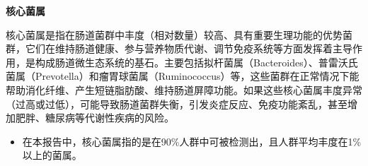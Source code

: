 \documentclass[UTF8]{ctexart}
\begin{document}
\newpage

\begin{tcolorbox}[
    enhanced,
    colback=white,
    colframe=white,
    arc=2mm,
    boxrule=0pt,
    width=\textwidth,
    left=15pt,
    right=15pt,
    top=10pt,
    bottom=10pt,
    drop shadow={
        opacity=0.2,
        color=customTeal
    },
    borderline west={5pt}{0pt}{customTeal}
]
\textcolor{customTeal}{\large\faBacteria\textbf{核心菌属}}
\end{tcolorbox}

\vspace{0.05cm}

\begin{tcolorbox}[
    enhanced,
    colback=customTeal!15,
    colframe=customTeal,
    arc=3mm,
    boxrule=0pt,
    width=\textwidth,
    top=8pt,
    bottom=8pt
]
{\normalsize{\color{customTeal}\faInfoCircle} 核心菌属是指在肠道菌群中丰度（相对数量）较高、具有重要生理功能的优势菌群，它们在维持肠道健康、参与营养物质代谢、调节免疫系统等方面发挥着主导作用，是构成肠道微生态系统的基石。主要包括拟杆菌属（Bacteroides）、普雷沃氏菌属（Prevotella）和瘤胃球菌属（Ruminococcus）等，这些菌群在正常情况下能帮助消化纤维、产生短链脂肪酸、维持肠道屏障功能。如果这些核心菌属丰度异常（过高或过低），可能导致肠道菌群失衡，引发炎症反应、免疫功能紊乱，甚至增加肥胖、糖尿病等代谢性疾病的风险。
\begin{itemize}
    \item 在本报告中，核心菌属指的是在90\%人群中可被检测出，且人群平均丰度在1\%以上的菌属。
\end{itemize}
}
\end{tcolorbox}

\vspace{-0.5cm}

\newcommand{\fooddata}{
    {
        {梭菌属}/{Clostridium}/1.90370/{0-4.464}/67\%/99.52\%/正常/{厌氧菌，能产生丁酸盐，参与胆汁酸代谢和色氨酸代谢，对维持肠道屏障功能和免疫系统调节具有重要作用}/{}/0,
        {普雷沃氏菌属}/{Prevotella}/0.04290/{0-67.8009}/50\%/99.52\%/正常/{革兰氏阴性厌氧菌，专门降解植物多糖和黏蛋白的菌群，产生琥珀酸和乙酸，与植物性饮食密切相关}/{}/1,
        {瘤胃球菌属}/{Ruminococcus}/9.84521/{0.0544-19.7985}/44\%/99.52\%/正常/{专性厌氧菌，是肠道主要的纤维素降解菌，能产生乙酸和丁酸，对维持结肠上皮细胞健康至关重要}/{}/2,
        {拟杆菌属}/{Bacteroides}/0.08974/{1.0578-47.3225}/2\%/99.04\%/偏低/{革兰氏阴性厌氧菌，能降解复杂碳水化合物，产生丙酸盐，参与胆固醇代谢，调节宿主免疫系统}/{建议增加全谷物、豆类等膳食纤维摄入}/3,
        {真杆菌属}/{Eubacterium}/5.75186/{0.1146-9.4883}/95\%/98.56\%/正常/{专性厌氧菌，主要产生丁酸盐，具有抗炎作用，参与胆固醇转化和胆汁酸代谢，维持肠道屏障完整性}/{}/4,
        {乳酸杆菌属}/{Lactobacillus}/0.00660/{0-0.4302}/8\%/91.83\%/正常/{革兰氏阳性兼性厌氧菌，产生乳酸和抗菌物质，增强肠道屏障功能，调节免疫系统，抑制有害菌生长}/{}/5,
        {芽孢杆菌属}/{Bacillus}/ND/{0.0001-0.5535}/27\%/77.88\%/未检出/{革兰氏阳性需氧菌，能形成芽孢，产生多种水解酶和抗菌肽，增强肠道免疫功能，改善肠道微生态平衡}/{建议适当补充含芽孢杆菌的活性益生菌制剂}/6,
        {Lachnoclostridium}/{Lachnoclostridium}/0.17516/{0-0.2086}/8\%/98.56\%/正常/{厌氧产丁酸菌，能降解复杂碳水化合物，产生短链脂肪酸，参与结肠上皮细胞能量代谢，维持肠道健康}/{}/7
    }
}
\end{document}
